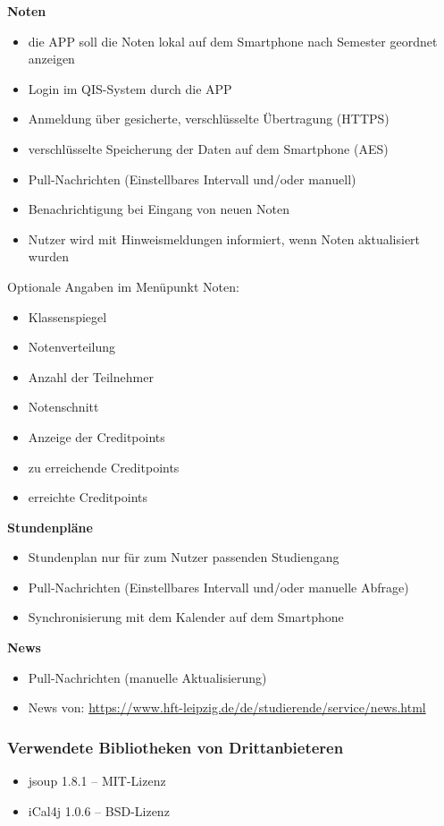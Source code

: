\textbf{Noten}
\begin{itemize}
	\item die APP soll die Noten lokal auf dem Smartphone nach Semester geordnet anzeigen
	\item Login im \acs{QIS}-System durch die APP
	\item Anmeldung über gesicherte, verschlüsselte Übertragung (\acs{HTTPS})
	\item verschlüsselte Speicherung der Daten auf dem Smartphone (\acs{AES})
	\item Pull-Nachrichten (Einstellbares Intervall und/oder manuell)
	\item Benachrichtigung bei Eingang von neuen Noten
	\item Nutzer wird mit Hinweismeldungen informiert, wenn Noten aktualisiert wurden
\end{itemize}
Optionale Angaben im Menüpunkt Noten:
\begin{itemize}
	\item Klassenspiegel
	\item Notenverteilung
	\item Anzahl der Teilnehmer
	\item Notenschnitt
	\item Anzeige der Creditpoints
	\item zu erreichende Creditpoints
	\item erreichte Creditpoints
\end{itemize}
\textbf{Stundenpläne}
\begin{itemize}
	\item Stundenplan nur für zum Nutzer passenden Studiengang
	\item Pull-Nachrichten (Einstellbares Intervall und/oder manuelle Abfrage)
	\item Synchronisierung mit dem Kalender auf dem Smartphone	
\end{itemize}
\textbf{News}
\begin{itemize}
	\item Pull-Nachrichten (manuelle Aktualisierung)
	\item News von: \url{https://www.hft-leipzig.de/de/studierende/service/news.html}
\end{itemize}



\subsubsection{Verwendete Bibliotheken von Drittanbieteren}
\begin{itemize}
	\item jsoup 1.8.1 – MIT-Lizenz
	\item iCal4j 1.0.6 – BSD-Lizenz 
\end{itemize}


